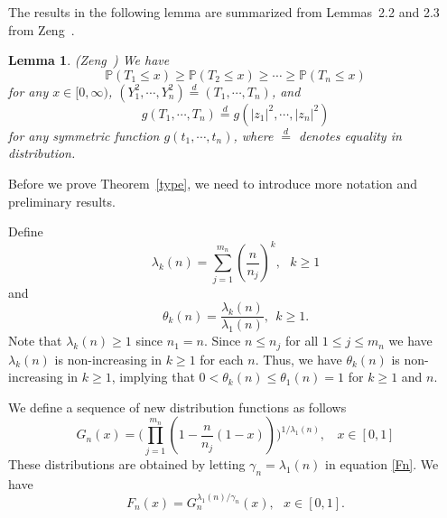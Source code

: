 \documentclass[11pt]{article}
\newtheorem{lemma}{\textbf{Lemma}}[section]
\numberwithin{equation}{section}
\begin{document}
The results in the following lemma are summarized  from Lemmas~2.2
and 2.3 from  Zeng~\cite{Zeng2017}.

\begin{lemma}\label{zeng} (Zeng~\cite{Zeng2017}) We have
\begin{equation}\label{eq1}
\mathbb{P}(T_{1} \leq x) \geq \mathbb{P}(T_{2} \leq x) \geq \cdots
\geq \mathbb{P}(T_{n} \leq x)
\end{equation}
for any $x \in[0, \infty)$, $(Y_1^2, \cdots,
Y_n^2)\overset{d}=(T_1,\cdots, T_n)$, and
\begin{equation}\label{eq2}
g(T_{1}, \cdots, T_{n})\overset{d}=g(|z_{1}|^{2}, \cdots,
|z_{n}|^{2})
\end{equation}
for any symmetric function $g(t_1,\cdots,t_n)$, where $\overset{d}=$
denotes equality in distribution.
\end{lemma}






Before we prove Theorem~\ref{type}, we need to introduce more
notation and preliminary results.

Define
\begin{equation}\label{lambda}
\lambda_k(n)=\sum^{m_n}_{j=1}(\frac{n}{n_j})^k,  ~~~k\ge 1
\end{equation}
and
\begin{equation}\label{theta}
\theta_k(n)=\frac{\lambda_k(n)}{\lambda_1(n)}, ~~k\ge 1.
\end{equation}
Note that $\lambda_k(n)\ge 1$ since $n_1=n$. Since $n\le n_j$ for
all $1\le j\le m_n$ we have $\lambda_k(n)$ is non-increasing in
$k\ge 1$ for each $n$. Thus, we have $\theta_k(n)$ is non-increasing
in $k\ge 1$, implying that $0<\theta_k(n)\le \theta_1(n)=1$ for
$k\ge 1$ and $n$.

We define a sequence of new distribution functions as follows
\begin{equation}\label{Gn}
    G_{n}(x)=
    \Big(\prod_{j=1}^{m_n} (1-\frac{n}{n_j}(1-x))\Big)^{1 /\lambda_1(n)},~~~~  x \in[0,1]
\end{equation}
These distributions are obtained by letting $\gamma_n=\lambda_1(n)$
in equation \eqref{Fn}.  We have
\begin{equation}\label{FG}
F_n(x)=G_n^{\lambda_1(n)/\gamma_n}(x), ~~~x\in [0,1].
\end{equation}
\end{document}

